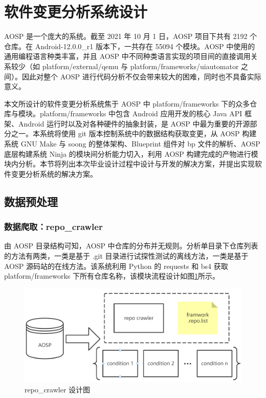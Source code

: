 \section{软件变更分析系统设计}\label{system-design}

AOSP 是一个庞大的系统。截至 2021 年 10 月 1 日，AOSP 项目下共有 2192 个仓库。在 Android-12.0.0\_r1 版本下，一共存在 55094 个模块。AOSP 中使用的通用编程语言种类丰富，并且 AOSP 中不同种类语言实现的项目间的直接调用关系较少（如 platform/external/qemu 与 platform/frameworks/uiautomator 之间）。因此对整个 AOSP 进行代码分析不仅会带来较大的困难，同时也不具备实际意义。

本文所设计的软件变更分析系统焦于 AOSP 中 platform/frameworks 下的众多仓库与模块。platform/frameworks 中包含 Android 应用开发的核心 Java API 框架、Android 运行时以及对各种硬件的抽象封装，是 AOSP 中最为重要的开源部分之一。本系统将使用 git 版本控制系统中的数据结构获取变更，从 AOSP 构建系统 GNU Make 与 soong 的整体架构、Blueprint 组件对 bp 文件的解析、AOSP 底层构建系统 Ninja 的模块间分析能力切入，利用 AOSP 构建完成的产物进行模块内分析。本节将列出本次毕业设计过程中设计与开发的解决方案，并提出实现软件变更分析系统的解决方案。

\subsection{数据预处理}

\subsubsection{数据爬取：repo\_crawler}

由 AOSP 目录结构可知，AOSP 中仓库的分布并无规则。分析单目录下仓库列表的方法有两类，一类是基于 .git 目录进行试探性测试的离线方法，一类是基于 AOSP 源码站的在线方法。该系统利用 Python 的 requests 和 bs4 获取 platform/frameworks 下所有仓库名称，该模块流程设计如图\ref{fig:archi-repo-crawler}所示。

\begin{figure}[htb]
    \centering
    \includegraphics[width=.9\textwidth]{figures/archi-repo-crawler.png}
    \caption{repo\_crawler 设计图}
    \label{fig:archi-repo-crawler}
\end{figure}

